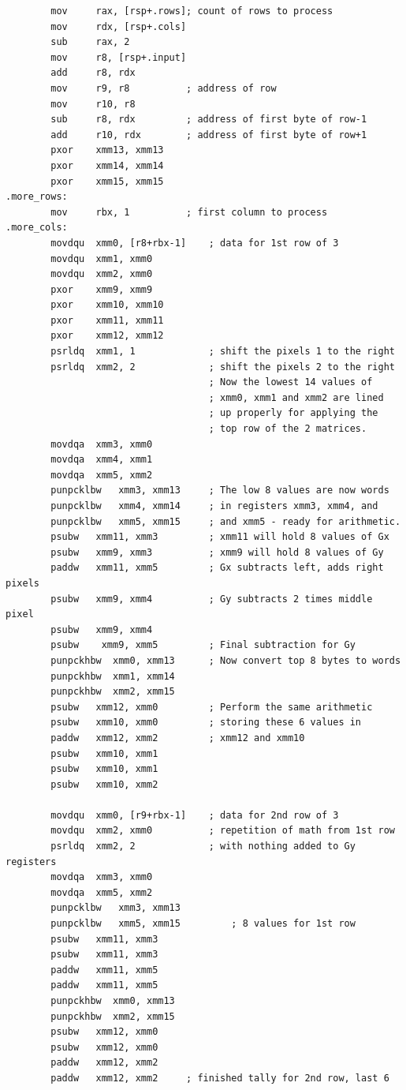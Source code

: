 \documentclass[11pt,b5paper]{book}
\begin{document}
\begin{verbatim}
        mov     rax, [rsp+.rows]; count of rows to process
        mov     rdx, [rsp+.cols]
        sub     rax, 2
        mov     r8, [rsp+.input]
        add     r8, rdx
        mov     r9, r8          ; address of row
        mov     r10, r8
        sub     r8, rdx         ; address of first byte of row-1
        add     r10, rdx        ; address of first byte of row+1
        pxor    xmm13, xmm13
        pxor    xmm14, xmm14
        pxor    xmm15, xmm15
.more_rows:
        mov     rbx, 1          ; first column to process
.more_cols:
        movdqu  xmm0, [r8+rbx-1]    ; data for 1st row of 3
        movdqu  xmm1, xmm0
        movdqu  xmm2, xmm0
        pxor    xmm9, xmm9
        pxor    xmm10, xmm10
        pxor    xmm11, xmm11
        pxor    xmm12, xmm12
        psrldq  xmm1, 1             ; shift the pixels 1 to the right
        psrldq  xmm2, 2             ; shift the pixels 2 to the right
                                    ; Now the lowest 14 values of
                                    ; xmm0, xmm1 and xmm2 are lined
                                    ; up properly for applying the
                                    ; top row of the 2 matrices.
        movdqa  xmm3, xmm0
        movdqa  xmm4, xmm1
        movdqa  xmm5, xmm2
        punpcklbw   xmm3, xmm13     ; The low 8 values are now words 
        punpcklbw   xmm4, xmm14     ; in registers xmm3, xmm4, and
        punpcklbw   xmm5, xmm15     ; and xmm5 - ready for arithmetic.
        psubw   xmm11, xmm3         ; xmm11 will hold 8 values of Gx
        psubw   xmm9, xmm3          ; xmm9 will hold 8 values of Gy
        paddw   xmm11, xmm5         ; Gx subtracts left, adds right pixels
        psubw   xmm9, xmm4          ; Gy subtracts 2 times middle pixel
        psubw   xmm9, xmm4
        psubw    xmm9, xmm5         ; Final subtraction for Gy
        punpckhbw  xmm0, xmm13      ; Now convert top 8 bytes to words
        punpckhbw  xmm1, xmm14      
        punpckhbw  xmm2, xmm15
        psubw   xmm12, xmm0         ; Perform the same arithmetic
        psubw   xmm10, xmm0         ; storing these 6 values in
        paddw   xmm12, xmm2         ; xmm12 and xmm10
        psubw   xmm10, xmm1
        psubw   xmm10, xmm1
        psubw   xmm10, xmm2     
        
        movdqu  xmm0, [r9+rbx-1]    ; data for 2nd row of 3
        movdqu  xmm2, xmm0          ; repetition of math from 1st row
        psrldq  xmm2, 2             ; with nothing added to Gy registers
        movdqa  xmm3, xmm0
        movdqa  xmm5, xmm2
        punpcklbw   xmm3, xmm13
        punpcklbw   xmm5, xmm15         ; 8 values for 1st row
        psubw   xmm11, xmm3
        psubw   xmm11, xmm3
        paddw   xmm11, xmm5
        paddw   xmm11, xmm5
        punpckhbw  xmm0, xmm13
        punpckhbw  xmm2, xmm15
        psubw   xmm12, xmm0
        psubw   xmm12, xmm0
        paddw   xmm12, xmm2
        paddw   xmm12, xmm2     ; finished tally for 2nd row, last 6


\end{verbatim}
\end{document}
